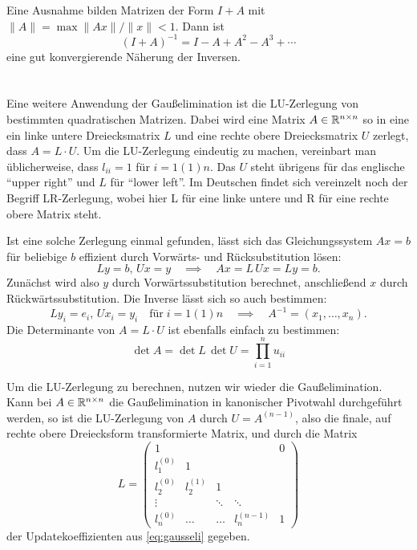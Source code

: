 Eine Ausnahme bilden Matrizen der Form $I + A$ mit $\lVert A \rVert =
\max \lVert Ax\rVert / \lVert x \rVert < 1$. Dann ist
\begin{equation}
  (I+A)^{-1} = I - A + A^2 - A^3 + \cdots
\end{equation}
eine gut konvergierende Näherung der Inversen.

\section{}

Eine weitere Anwendung der Gaußelimination ist die LU-Zerlegung von
bestimmten quadratischen Matrizen. Dabei wird eine Matrix
$A\in\mathbb{R}^{n\times n}$ so in eine ein linke untere Dreiecksmatrix $L$
und eine rechte obere Dreiecksmatrix $U$ zerlegt, dass $A=L\cdot U$.
Um die LU-Zerlegung eindeutig zu machen, vereinbart man üblicherweise,
dass $l_{ii}=1$ für $i=1(1)n$. Das $U$ steht übrigens für das
englische "`upper right"' und $L$ für "`lower left"'. Im Deutschen
findet sich vereinzelt noch der Begriff LR-Zerlegung, wobei hier L für
eine linke untere und R für eine rechte obere Matrix steht.

Ist eine solche Zerlegung einmal gefunden, lässt sich das
Gleichungssystem $Ax=b$ für beliebige $b$ effizient durch Vorwärts-
und Rücksubstitution lösen:
\begin{equation}
  L y = b,\, U x = y \quad\implies\quad Ax = L\,U x = L y = b.
\end{equation}
Zunächst wird also $y$ durch Vorwärtssubstitution berechnet,
anschließend $x$ durch Rückwärtssubstitution. Die Inverse lässt
sich so auch bestimmen:
\begin{equation}
  L y_i = e_i,\, U x_i = y_i\quad\text{für}\; i=1(1)n
  \quad\implies\quad  A^{-1} = \left(x_1,
    \ldots, x_n\right).
\end{equation}
Die Determinante von $A=L\cdot U$ ist ebenfalls einfach zu bestimmen:
\begin{equation}
  \det A = \det L\,\det U = \prod_{i=1}^n u_{ii}
\end{equation}

Um die LU-Zerlegung zu berechnen, nutzen wir wieder die
Gaußelimination.  Kann bei $A\in\mathbb{R}^{n\times n}$ die Gaußelimination
in kanonischer Pivotwahl durchgeführt werden, so ist die LU-Zerlegung
von $A$ durch $U=A^{(n-1)}$, also die finale, auf rechte obere
Dreiecksform transformierte Matrix, und durch die Matrix
\begin{equation}
  L =
  \begin{pmatrix}
    1       &          &         &          & 0 \\
    l_1^{(0)} & 1       &         &           &  \\
    l_2^{(0)} & l_2^{(1)} & 1       &          &  \\
    \vdots  &          & \ddots & \ddots    & \\
    l_n^{(0)} & \ldots  & \ldots  & l_n^{(n-1)} & 1
  \end{pmatrix}
\end{equation}
der Updatekoeffizienten aus \eqref{eq:gausseli} gegeben.

